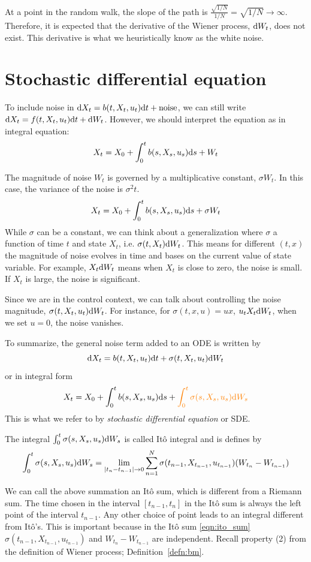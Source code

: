 \documentclass[11pt]{book}
\newcommand{\dt}{\text{\normalfont d}t}
\newcommand{\ds}{\text{\normalfont d}s}
\newcommand{\dX}{\text{\normalfont d}X}
\newcommand{\dW}{\text{\normalfont d}W}
\begin{document}
At a point in the random walk, the slope of the path is $\frac{\sqrt{1/N}}{1/N}=\sqrt{1/N}\to\infty$. Therefore, it is expected that the derivative of the Wiener process, $\dW_t$, does not exist. This derivative is what we heuristically know as the white noise. 

\section{Stochastic differential equation}
\label{sec:sde}
To include noise in $\dX_t=b(t,X_t,u_t)\dt+\text{noise}$, we can still write  $\dX_t=f(t,X_t,u_t)\dt+\dW_t$. However, we should interpret the equation as in integral equation:
\[
X_t=X_0+\int_0^t b(s,X_s,u_s)\ds+W_t
\]

The magnitude of noise $W_t$ is governed by a multiplicative constant, $\sigma W_t$. In this case, the variance of the noise is $\sigma^2 t$.   
\[
X_t=X_0+\int_0^t b(s,X_s,u_s)\ds+\sigma W_t
\]
While $\sigma$ can be a constant, we can think about a generalization where $\sigma$ a function of time $t$ and state $X_t$, i.e. $\sigma(t,X_t) \dW_t$. This means for different $(t,x)$ the magnitude of noise evolves in time and bases on the current value of state variable. For example, $X_t\dW_t$ means when $X_t$ is close to zero, the noise is small. If $X_t$ is large, the noise is significant. 

Since we are in the control context, we can talk about controlling the noise magnitude, $\sigma(t,X_t,u_t) \dW_t$. For instance, for $\sigma(t,x,u)=ux$, $u_tX_t\dW_t$, when we set $u=0$, the noise vanishes. 

To summarize, the general noise term added to an ODE is written by 
\[
\dX_t= b(t,X_t,u_t)\dt+\sigma(t,X_t,u_t)\dW_t
\]
or in integral form
\[
X_t=X_0+\int_0^t b(s,X_s,u_s)\ds+{\color{orange}\int_0^t \sigma(s,X_s,u_s)\dW_s}
\]
This is what we refer to by \emph{stochastic differential equation} or SDE.

The integral $\int_0^t \sigma(s,X_s,u_s)\dW_s$ is called Itô integral and is defines by
\begin{equation}
\label{eqn:ito_sum}
\int_0^t \sigma(s,X_s,u_s)\dW_s = \lim_{|t_n-t_{n-1}|\to0}\sum_{n=1}^{N} \sigma(t_{n-1},X_{t_{n-1}},u_{t_{n-1}})(W_{t_{n}}-W_{t_{n-1}})    
\end{equation}

We can call the above summation an Itô sum, which is different from a Riemann sum. The time chosen in the interval $[t_{n-1},t_{n}]$ in the Itô sum is always the left point of the interval $t_{n-1}$. Any other choice of point leads to an integral different from Itô's.  This is important because in the Itô sum \eqref{eqn:ito_sum} $\sigma(t_{n-1},X_{t_{n-1}},u_{t_{n-1}})$ and $W_{t_{n}}-W_{t_{n-1}}$ are independent. Recall property (2) from the definition of Wiener process; Definition~\ref{defn:bm}.
\end{document}
